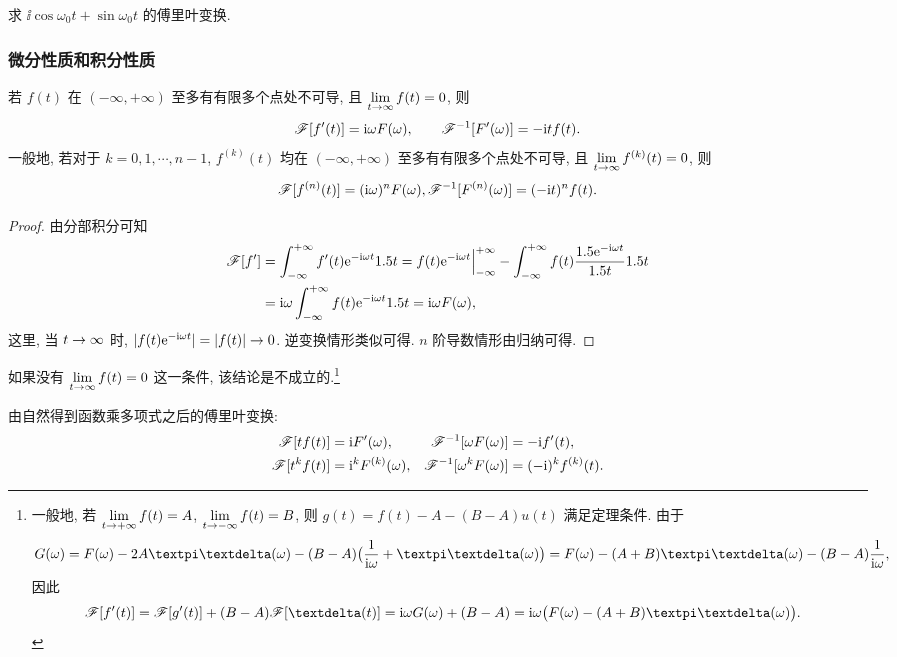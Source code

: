 \begin{exercise}
  求 $\ii\cos{\omega_0 t}+\sin{\omega_0 t}$ 的傅里叶变换.
\end{exercise}


\subsubsection{微分性质和积分性质}

\begin{theorem}[微分性质]
  \label{thm:fourier-differential-property}
  若 $f(t)$ 在 $(-\infty,+\infty)$ 至多有有限多个点处不可导, 且 $\lim\limits_{t\rightarrow\infty}f(t)=0$, 则
  \[
    \mathscr{F}[f'(t)]=\mathrm{i} \omega F(\omega),\qquad
    \mathscr{F}^{-1}[F'(\omega)]=-\mathrm{i} tf(t).
  \]
  一般地, 若对于 $k=0,1,\cdots,n-1$, $f^{(k)}(t)$ 均在 $(-\infty,+\infty)$ 至多有有限多个点处不可导, 且 $\lim\limits_{t\rightarrow\infty}f^{(k)}(t)=0$, 则
  \[
    \mathscr{F}[f^{(n)}(t)]=(\mathrm{i} \omega)^n F(\omega),
    \mathscr{F}^{-1}[F^{(n)}(\omega)]=(-\mathrm{i} t)^nf(t).
  \]
\end{theorem}

\begin{proof}
  由分部积分可知
  \begin{align*}
    \mathscr{F}[f']
    &=\displaystyle\int_{-\infty}^{+\infty} f'(t)\mathrm{e}^{-\mathrm{i} \omega t}1.5 t
    =f(t)\mathrm{e}^{-\mathrm{i} \omega t}\Big|_{-\infty}^{+\infty}-\displaystyle\int_{-\infty}^{+\infty} f(t)\frac{1.5 \mathrm{e}^{-\mathrm{i} \omega t}}{1.5 t}1.5 t\\
    &=\mathrm{i} \omega \displaystyle\int_{-\infty}^{+\infty} f(t)\mathrm{e}^{-\mathrm{i} \omega t}1.5 t
    =\mathrm{i} \omega F(\omega),
  \end{align*}
  这里, 当 $t\rightarrow \infty$ 时, $\lvert f(t)\mathrm{e}^{-\mathrm{i}\omega t}\rvert=\lvert f(t)\rvert\rightarrow 0$.
  逆变换情形类似可得.
  $n$ 阶导数情形由归纳可得.
\end{proof}

如果没有 $\lim\limits_{t\rightarrow\infty}f(t)=0$ 这一条件, 该结论是不成立的.\footnote{
  一般地, 若 $\lim\limits_{t\rightarrow+\infty}f(t)=A$, $\lim\limits_{t\rightarrow-\infty}f(t)=B$, 则 $g(t)=f(t)-A-(B-A)u(t)$ 满足定理条件.
  由于
  \[
    G(\omega)
    =F(\omega)-2A\cpi\dirac(\omega)-(B-A)\bigl(\frac1{\ii \omega}+\cpi\dirac(\omega)\bigr)
    =F(\omega)-(A+B)\cpi\dirac(\omega)-(B-A)\frac1{\ii \omega},
  \]
  因此
  \begin{align*}
    \msf[f'(t)]
    &=\msf[g'(t)]+(B-A)\msf[\dirac(t)]
    =\ii \omega G(\omega)+(B-A)
    =\ii \omega \bigl(F(\omega)-(A+B)\cpi\dirac(\omega)\bigr).
  \end{align*}
}

由\thmFDif 自然得到函数乘多项式之后的傅里叶变换:
\begin{align*}
  \mathscr{F}[tf(t)]&=\mathrm{i} F'(\omega),&
  \mathscr{F}^{-1}[\omega F(\omega)]&=-\mathrm{i} f'(t),\\
  \mathscr{F}[t^kf(t)]&=\mathrm{i}^kF^{(k)}(\omega),&
  \mathscr{F}^{-1}[\omega^kF(\omega)]&=(-\mathrm{i} )^kf^{(k)}(t).
\end{align*}

